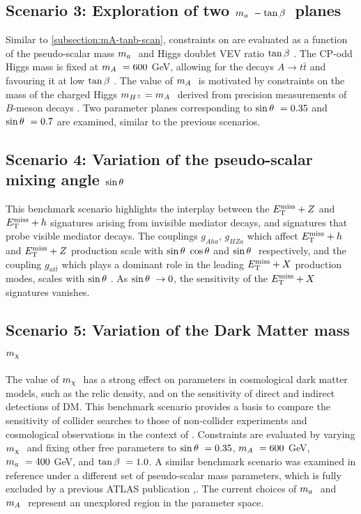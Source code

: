 \subsection{Scenario 3: Exploration of two \texorpdfstring{$m_a~-\tan\beta~$}{TEXT} planes }\label{subsection:ma-tanb-scan}

Similar to \ref{subsection:mA-tanb-scan}, constraints on \thdma are evaluated as a function of the pseudo-scalar mass $m_a~$ and Higgs doublet VEV ratio $\tan\beta~$. The CP-odd Higgs mass is fixed at $m_A~=600$ GeV, allowing for the decays $A\rightarrow t\bar{t}$ and favouring it at low $\tan\beta~$. The value of $m_A~$ is motivated by constraints on the mass of the charged Higgs $m_{H^{\pm}} = m_A~$ derived from precision measurements of $B$-meson decays \cite{Misiak:2017bgg,Bauer:2017ota}. Two parameter planes corresponding to $\sin\theta~=0.35$ and $\sin\theta~=0.7$ are examined, similar to the previous scenarios.

\subsection{Scenario 4: Variation of the pseudo-scalar mixing angle \texorpdfstring{$\sin\theta~$}{TEXT} }
\label{subsection:sint-scan}
This benchmark scenario highlights the interplay between the $E_{\mathrm{T}}^{\mathrm{miss}}+Z$ and $E_{\mathrm{T}}^{\mathrm{miss}}+h$ signatures arising from invisible mediator decays, and signatures that probe visible mediator decays. The couplings $g_{Aha}$, $g_{HZa}$ which affect $E_{\mathrm{T}}^{\mathrm{miss}}+h$ and $E_{\mathrm{T}}^{\mathrm{miss}}+Z$ production scale with $\sin\theta~\cos\theta$ and $\sin\theta~$ respectively, and the coupling $g_{at\bar{t}}$ which plays a dominant role in the leading $E_{\mathrm{T}}^{\mathrm{miss}}+X$ production modes, scales with $\sin\theta~$. As $\sin\theta~\rightarrow 0$, the sensitivity of the $E_{\mathrm{T}}^{\mathrm{miss}}+X$ signatures vanishes. 

\subsection{Scenario 5: Variation of the Dark Matter mass \texorpdfstring{$m_{\chi}~$}{TEXT} }
\label{subsection:mchi-scan}
The value of $m_{\chi}~$ has a strong effect on parameters in cosmological dark matter models, such as the relic density, and on the sensitivity of direct and indirect detections of DM. This benchmark scenario provides a basis to compare the sensitivity of collider searches to those of non-collider experiments and cosmological observations in the context of \hdma. Constraints are evaluated by varying $m_{\chi}~$ and fixing other free parameters to $\sin\theta~=0.35$, $m_A~=600$ GeV, $m_a~=400$ GeV, and $\tan\beta~=1.0$. A similar benchmark scenario was examined in reference \cite{2HDMWGproxi} under a different set of pseudo-scalar mass parameters, which is fully excluded by a previous ATLAS publication \cite{EXOT-2017-32},. The current choices of $m_a~$ and $m_A~$ represent an unexplored region in the parameter space. 

